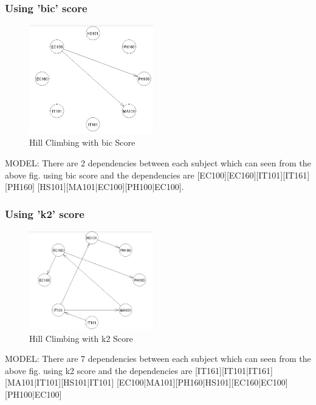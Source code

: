 \documentclass[15pt,journal]{IEEEtran}
\begin{document}
\subsubsection{Using {{\bf{'bic'}}} score}
\begin{figure}[H]%
\begin {center}
\includegraphics[width=0.48\textwidth]{images/Bayesian_bic.png}
\caption{Hill Climbing with bic Score} %
\label{fig:ecg}
\end {center}
\end{figure}

MODEL: There are 2 dependencies between each subject which can seen from the above fig. using bic score and the dependencies are
[EC100][EC160][IT101][IT161][PH160]
[HS101][MA101|EC100][PH100|EC100].


\subsubsection{Using {{\bf{'k2'}}} score}

\begin{figure}[H]%
\begin {center}
\includegraphics[width=0.48\textwidth]{images/Bayesian_K2.png}
\caption{Hill Climbing with k2 Score} %
\label{fig:ecg}
\end {center}
\end{figure}

MODEL: There are 7 dependencies between each subject which can seen from the above fig. using k2 score and the dependencies are
[IT161][IT101|IT161][MA101|IT101][HS101|IT101]
[EC100|MA101][PH160|HS101][EC160|EC100]
[PH100|EC100]
\end{document}
